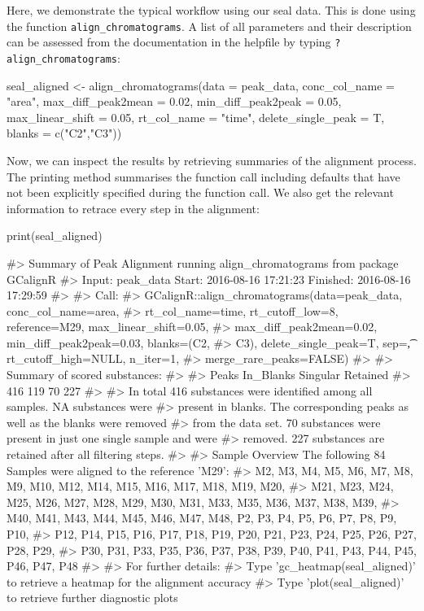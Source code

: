 Here, we demonstrate the typical workflow using our seal data. This is
done using the function \texttt{align\_chromatograms}. A list of all
parameters and their description can be assessed from the documentation
in the helpfile by typing \texttt{?align\_chromatograms}:

\begin{Schunk}
\begin{Sinput}
seal_aligned <- align_chromatograms(data = peak_data,
                    conc_col_name = "area",
                    max_diff_peak2mean = 0.02,
                    min_diff_peak2peak = 0.05,
                    max_linear_shift = 0.05,
                    rt_col_name = "time",
                    delete_single_peak = T,
                    blanks = c("C2","C3"))
\end{Sinput}
\end{Schunk}

Now, we can inspect the results by retrieving summaries of the alignment
process. The printing method summarises the function call including
defaults that have not been explicitly specified during the function
call. We also get the relevant information to retrace every step in the
alignment:

\begin{Schunk}
\begin{Sinput}
print(seal_aligned)
\end{Sinput}
\begin{Soutput}
#>   Summary of Peak Alignment running align_chromatograms from package GCalignR
#>   Input: peak_data   Start:  2016-08-16 17:21:23     Finished:  2016-08-16 17:29:59 
#> 
#> Call:
#>   GCalignR::align_chromatograms(data=peak_data, conc_col_name=area,
#>   rt_col_name=time, rt_cutoff_low=8, reference=M29, max_linear_shift=0.05,
#>   max_diff_peak2mean=0.02, min_diff_peak2peak=0.03, blanks=(C2,
#>   C3), delete_single_peak=T, sep=\t, rt_cutoff_high=NULL, n_iter=1,
#>   merge_rare_peaks=FALSE)
#> 
#> Summary of scored substances:
#> 
#>     Peaks In_Blanks  Singular  Retained 
#>       416       119        70       227 
#> 
#>   In total 416 substances were identified among all samples. NA substances were
#>   present in blanks. The corresponding peaks as well as the blanks were removed
#>   from the data set. 70 substances were present in just one single sample and were
#>   removed. 227 substances are retained after all filtering steps.
#> 
#> Sample Overview  The following 84 Samples were aligned to the reference 'M29':
#>   M2, M3, M4, M5, M6, M7, M8, M9, M10, M12, M14, M15, M16, M17, M18, M19, M20,
#>   M21, M23, M24, M25, M26, M27, M28, M29, M30, M31, M33, M35, M36, M37, M38, M39,
#>   M40, M41, M43, M44, M45, M46, M47, M48, P2, P3, P4, P5, P6, P7, P8, P9, P10,
#>   P12, P14, P15, P16, P17, P18, P19, P20, P21, P23, P24, P25, P26, P27, P28, P29,
#>   P30, P31, P33, P35, P36, P37, P38, P39, P40, P41, P43, P44, P45, P46, P47, P48
#> 
#> For further details:
#>   Type 'gc_heatmap(seal_aligned)' to retrieve a heatmap for the alignment accuracy
#>   Type 'plot(seal_aligned)' to retrieve further diagnostic plots
\end{Soutput}
\end{Schunk}

